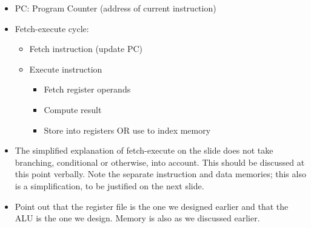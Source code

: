 


\begin{frame}[fragile]
\begin{itemize}
\item PC: Program Counter (address of current instruction)
\item Fetch-execute cycle:
\begin{itemize}
\item Fetch instruction (update PC)
\item Execute instruction
\begin{itemize}
\item Fetch register operands
\item Compute result
\item Store into registers OR use to index memory
\end{itemize}
\end{itemize}
\end{itemize}
\BNotes\ifnum{}
\begin{itemize}
\item The simplified explanation of fetch-execute on the slide does not take
	branching, conditional or otherwise, into account. This should be
	discussed at this point verbally. Note the separate instruction and
	data memories; this also is a simplification, to be justified on the
	next slide.
\item Point out that the register file is the one we designed earlier and
	that the ALU is the one we design.
	Memory is also as we discussed earlier.
\end{itemize}
\fi\ENotes
\end{frame}


